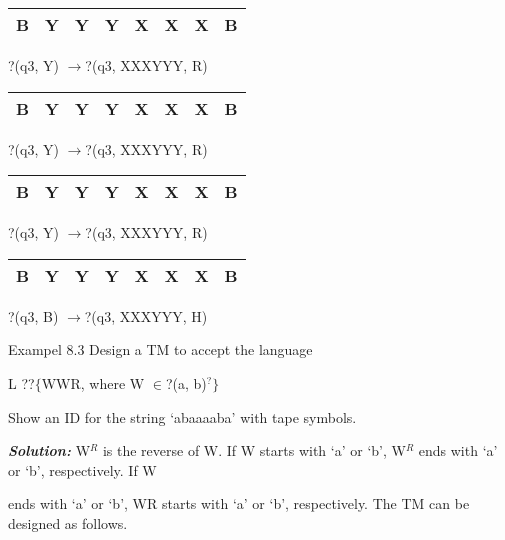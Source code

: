 \documentclass{article} %
\begin{document}
\noindent 

\noindent 

\noindent 

\noindent 

\noindent 

\begin{tabular}{|p{0.2in}|p{0.2in}|p{0.2in}|p{0.2in}|p{0.2in}|p{0.2in}|p{0.2in}|p{0.2in}|} \hline 
B & Y & Y & Y & X & X & X & B \\ \hline 
\end{tabular}

?(q3, Y) $\mathrm{\to }$?(q3, XXXYYY, R)

\noindent 

\begin{tabular}{|p{0.2in}|p{0.2in}|p{0.2in}|p{0.2in}|p{0.2in}|p{0.2in}|p{0.2in}|p{0.2in}|} \hline 
B & Y & Y & Y & X & X & X & B \\ \hline 
\end{tabular}

?(q3, Y) $\mathrm{\to }$?(q3, XXXYYY, R)

\noindent 

\begin{tabular}{|p{0.2in}|p{0.2in}|p{0.2in}|p{0.2in}|p{0.2in}|p{0.2in}|p{0.2in}|p{0.2in}|} \hline 
B & Y & Y & Y & X & X & X & B \\ \hline 
\end{tabular}

?(q3, Y) $\mathrm{\to }$?(q3, XXXYYY, R)

\noindent 

\begin{tabular}{|p{0.2in}|p{0.2in}|p{0.2in}|p{0.2in}|p{0.2in}|p{0.2in}|p{0.2in}|p{0.2in}|} \hline 
B & Y & Y & Y & X & X & X & B \\ \hline 
\end{tabular}

?(q3, B) $\mathrm{\to }$?(q3, XXXYYY, H)

\noindent 

\noindent     Exampel 8.3      Design a TM to accept the language

\noindent L ??$\mathrm{\{}$WWR, where W $\in $?(a, b)${}^{\mathrm{\textrm{?}}}$$\mathrm{\}}$

\noindent Show an ID for the string `abaaaaba' with tape symbols.

\noindent \textbf{\textit{Solution: }}W${}^{R}$ is the reverse of W. If W starts with `a' or `b', W${}^{R}$ ends with `a' or `b', respectively. If W

\noindent ends with `a' or `b', WR starts with `a' or `b', respectively. The TM can be designed as follows.
\end{document}
